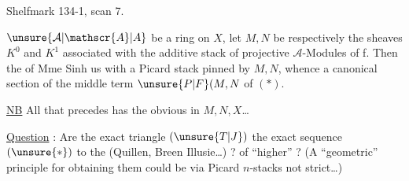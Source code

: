 Shelfmark 134-1, scan 7.


\uline{}\unsure{:|,}  $\unsure{\mathcal{A}|\mathscr{A}|A}$ be a ring on $X$, let $M,N$ be respectively the sheaves $K^{0}$ and $K^{1}$ associated with the additive stack of projective $\mathcal{A}$-Modules of  f.  Then the  of Mme Sinh  us with a Picard stack pinned by $M,N$, whence a canonical section  of the middle term $\unsure{P|F}(M,N$ of $(*)$.

\uline{NB} All that precedes has the obvious  in $M,N,X$\ldots

\uline{Question} : Are the exact triangle $(\unsure{T|J})$  the exact sequence $(\unsure{*})$  to the  (Quillen, Breen Illusie\ldots) ?  of ``higher''  ? (A ``geometric'' principle for obtaining them could be via Picard $n$-stacks not  strict\ldots)

